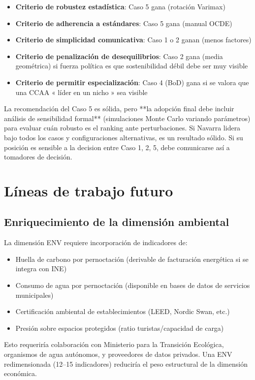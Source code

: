 \begin{itemize}
    \item \textbf{Criterio de robustez estadística}: Caso 5 gana (rotación Varimax)
    \item \textbf{Criterio de adherencia a estándares}: Caso 5 gana (manual OCDE)
    \item \textbf{Criterio de simplicidad comunicativa}: Caso 1 o 2 ganan (menos factores)
    \item \textbf{Criterio de penalización de desequilibrios}: Caso 2 gana (media geométrica) si fuerza política es que sostenibilidad débil debe ser muy visible
    \item \textbf{Criterio de permitir especialización}: Caso 4 (BoD) gana si se valora que una CCAA « líder en un nicho » sea visible
\end{itemize}

La recomendación del Caso 5 es sólida, pero **la adopción final debe incluir análisis de sensibilidad formal** (simulaciones Monte Carlo variando parámetros) para evaluar cuán robusto es el ranking ante perturbaciones. Si Navarra lidera bajo todos los casos y configuraciones alternativas, es un resultado sólido. Si su posición es sensible a la decision entre Caso 1, 2, 5, debe comunicarse así a tomadores de decisión.

\section{Líneas de trabajo futuro}

\subsection{Enriquecimiento de la dimensión ambiental}

La dimensión ENV requiere incorporación de indicadores de:
\begin{itemize}
    \item Huella de carbono por pernoctación (derivable de facturación energética si se integra con INE)
    \item Consumo de agua por pernoctación (disponible en bases de datos de servicios municipales)
    \item Certificación ambiental de establecimientos (LEED, Nordic Swan, etc.)
    \item Presión sobre espacios protegidos (ratio turistas/capacidad de carga)
\end{itemize}

Esto requeriría colaboración con Ministerio para la Transición Ecológica, organismos de agua autónomos, y proveedores de datos privados. Una ENV redimensionada (12--15 indicadores) reduciría el peso estructural de la dimensión económica.

